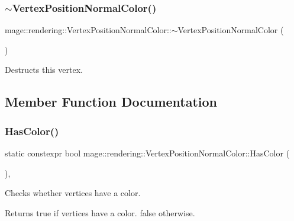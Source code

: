 \subsubsection{\texorpdfstring{$\sim$\+Vertex\+Position\+Normal\+Color()}{~VertexPositionNormalColor()}}
{\footnotesize\ttfamily mage\+::rendering\+::\+Vertex\+Position\+Normal\+Color\+::$\sim$\+Vertex\+Position\+Normal\+Color (\begin{DoxyParamCaption}{ }\end{DoxyParamCaption})\hspace{0.3cm}{\ttfamily [default]}}

Destructs this vertex. 

\subsection{Member Function Documentation}
\hypertarget{structmage_1_1rendering_1_1_vertex_position_normal_color_ae1d38a1d2e3f546c475849ec360f5317}{}\label{structmage_1_1rendering_1_1_vertex_position_normal_color_ae1d38a1d2e3f546c475849ec360f5317} 
\subsubsection{\texorpdfstring{Has\+Color()}{HasColor()}}
{\footnotesize\ttfamily static constexpr bool mage\+::rendering\+::\+Vertex\+Position\+Normal\+Color\+::\+Has\+Color (\begin{DoxyParamCaption}{ }\end{DoxyParamCaption})\hspace{0.3cm}{\ttfamily [static]}, {\ttfamily [noexcept]}}

Checks whether vertices have a color.

\begin{DoxyReturn}{Returns}
{\ttfamily true} if vertices have a color. {\ttfamily false} otherwise. 
\end{DoxyReturn}
\hypertarget{structmage_1_1rendering_1_1_vertex_position_normal_color_a663883aaff79837d1abb1c5cb54d2340}{}\label{structmage_1_1rendering_1_1_vertex_position_normal_color_a663883aaff79837d1abb1c5cb54d2340} 
